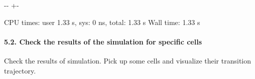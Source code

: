 \documentclass[letterpaper,10pt,english]{sphinxmanual}
\newlength\nbsphinxcodecellspacing
\begin{document}
{

\kern-\sphinxverbatimsmallskipamount\kern-\baselineskip
\kern+\FrameHeightAdjust\kern-\fboxrule
\vspace{\nbsphinxcodecellspacing}

\begin{sphinxVerbatim}[commandchars=\\\{\}]
CPU times: user 1.33 s, sys: 0 ns, total: 1.33 s
Wall time: 1.33 s
\end{sphinxVerbatim}
}


\paragraph{5.2. Check the results of the simulation for specific cells}
\label{\detokenize{notebooks/05_simulation/Gata1_KO_simulation_with_Paul_etal_2015_data:5.2.-Check-the-results-of-the-simulation-for-specific-cells}}
Check the results of simulation. Pick up some cells and visualize their transition trajectory.
\end{document}
